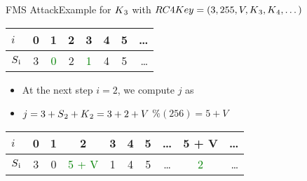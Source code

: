 \documentclass[
	aspectratio=169,	%
	onlytextwidth,		%
	t					%
	]{beamer}
\begin{document}
\begin{frame}[fragile]{FMS Attack}{Example for $K\textsubscript{3}$ with $RC4Key=(3,255,V,K\textsubscript{3},K\textsubscript{4},\dots)$}

	\begin{table}[h!]
		\begin{center}
			\begin{tabular}{l|c|c|c|c|c|c|r}
			$i$ & 0 & 1 & 2 & 3 & 4 & 5 & \dots\\
			\hline
			$S\textsubscript{i}$ & 3 & \textcolor{green}{0} & 2 & \textcolor{green}{1} & 4 & 5 & \dots\\
			\end{tabular}
		\end{center}
	\end{table}

	\begin{itemize}
		\item At the next step $i = 2$, we compute $j$ as
		\item $j = 3 + S\textsubscript{2} + K\textsubscript{2} = 3 + 2 + V$ $\% (256) = 5+V$
	\end{itemize}

	\begin{table}[h!]
		\begin{center}
			\begin{tabular}{l|c|c|c|c|c|c|c|c|r}
			$i$ & 0 & 1 & 2 & 3 & 4 & 5 & \dots & 5 + V & \dots\\
			\hline
			$S\textsubscript{i}$ & 3 & 0 & \textcolor{green}{5 + V} & 1 & 4 & 5 & \dots & \textcolor{green}{2} & \dots\\
			\end{tabular}
		\end{center}
	\end{table}

\end{frame}
\end{document}
